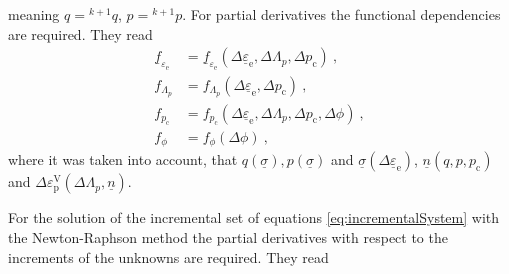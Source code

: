 \documentclass[paper=a4, twoside, pagesize]{scrartcl}
\newcommand{\tensor}[1]{\underline{#1}}
\renewcommand{\c}{\text{c}}
\newcommand{\e}{\text{e}}
\newcommand{\p}{\text{p}}
\begin{document}
meaning $q={}^{k+1}q$, $p={}^{k+1}p$. For partial derivatives the functional dependencies are required. They read
\begin{subequations}\label{eq:functionalDependence}
\begin{align}
  \tensor f_{\!\varepsilon_\e} &= \tensor f_{\!\varepsilon_\e}(\varDelta\tensor\varepsilon_\e, \varDelta\varLambda_p, \varDelta p_\c) \ ,\\
  f_{\!\varLambda_p} &= f_{\varLambda_p}(\varDelta\tensor\varepsilon_\e, \varDelta p_\c) \ , \\
  f_{p_\c} &= f_{p_\c}(\varDelta\tensor\varepsilon_\e, \varDelta\varLambda_p, \varDelta p_\c, \varDelta\phi)\ , \\
  f_{\phi} &= f_{\phi}(\varDelta\phi) \ ,
\end{align}
\end{subequations}
where it was taken into account, that $q(\tensor\sigma), p(\tensor\sigma)$ and $\tensor\sigma(\varDelta\tensor\varepsilon_\e)$, $\tensor n(q, p, p_\c)$ and $\varDelta\varepsilon_\p^\text{V}(\varDelta\varLambda_p, \tensor n)$.
\par
For the solution of the incremental set of equations \eqref{eq:incrementalSystem} with the Newton-Raphson method the partial derivatives with respect to the increments of the unknowns are required. They read
\end{document}
